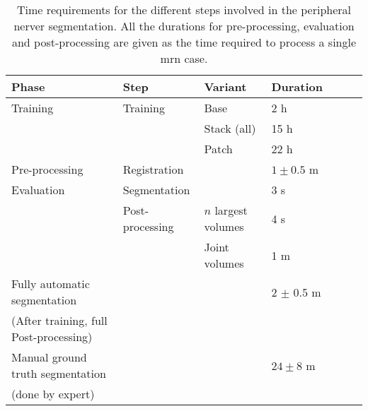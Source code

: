 \begin{table}[htbp]
   \centering
   \caption[Time Requirements]{Time requirements for the different steps involved in the peripheral nerver segmentation. All the durations for pre-processing, evaluation and post-processing are given as the time required to process a single \gls{mrn} case.}
   \begin{tabular}{l*{6}{l}}
      \toprule
      Phase	        & Step                  & Variant               & Duration\\
      \midrule
      Training      & Training              & Base                  & 2 h   \\
                    &                       & Stack (all)           & 15 h  \\
                    &                       & Patch                 & 22 h  \\
      \midrule
      Pre-processing& Registration          &                       & $1 \pm 0.5$ m \\
      \midrule
      Evaluation    & Segmentation          &                       & 3 s \\
                    & Post-processing       & $n$ largest volumes   & 4 s \\
                    &                       & Joint volumes         & 1 m \\
      \midrule
      Fully automatic segmentation & & & 2 $\pm$ 0.5 m\\
      (After training, full Post-processing)\\
      \midrule
      Manual ground truth segmentation & & & $24 \pm 8$ m\\
      (done by expert) \\
      \bottomrule
   \end{tabular}
   \label{tab:results_durations}
\end{table}





\endinput